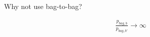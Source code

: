 Why not use bag-to-bag?

\begin{align}
  \frac{p_{bag,b}}{p_{bag,b'}} \rightarrow \infty
\end{align}